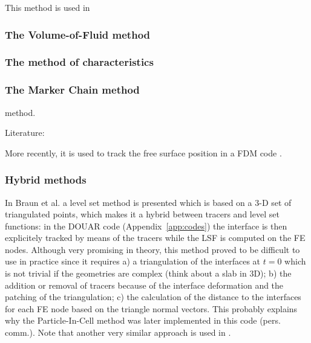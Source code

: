 This method is used in \cite{vyrc13}


\subsubsection{The Volume-of-Fluid method}

\cite{hini81}

\subsubsection{The method of characteristics}


\cite{devv00a}

\subsubsection{The Marker Chain method}
 method. 

Literature: \cite{woid78,chri82,chyu84,vaks97}

More recently, it is used to track the free surface position in a FDM code \cite{chmd19}.


\subsubsection{Hybrid methods}

In Braun et al. \cite{brtf08} a level set method is presented which is based on a 3-D set
of triangulated points, which makes it a hybrid between tracers and level set functions:
in the DOUAR code (Appendix~\ref{app:codes}) the interface is then explicitely tracked by means of the tracers while the LSF is computed 
on the FE nodes. Although very promising in theory, this method proved to be difficult to use in practice
since it requires a) a triangulation of the interfaces at $t=0$ which is not trivial if the geometries
are complex (think about a slab in 3D); b) the addition or removal of tracers because of the interface deformation
and the patching of the triangulation; c) the calculation of the distance to the interfaces for each 
FE node based on the triangle normal vectors. 
This probably explains why the Particle-In-Cell method was later implemented in this code (pers. comm.).
Note that another very similar approach is used in \cite{saev10}.



